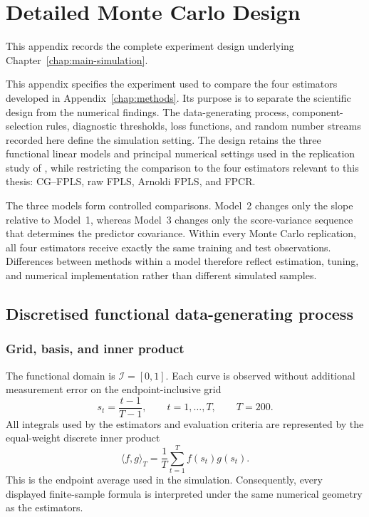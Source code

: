 \chapter{Detailed Monte Carlo Design}
\label{chap:simulation-design}

This appendix records the complete experiment design underlying
Chapter~\ref{chap:main-simulation}.

This appendix specifies the experiment used to compare the four estimators
developed in Appendix~\ref{chap:methods}.  Its purpose is to separate the
scientific design from the numerical findings.  The data-generating process,
component-selection rules, diagnostic thresholds, loss functions, and random
number streams recorded here define the simulation setting.  The design retains
the three functional linear models and principal numerical settings used in
the replication study of \textcite{babii_carrasco_tsafack_2026}, while
restricting the comparison to the four estimators relevant to this thesis:
CG--FPLS, raw FPLS, Arnoldi FPLS, and FPCR.

The three models form controlled comparisons.  Model~2 changes only the slope
relative to Model~1, whereas Model~3 changes only the score-variance sequence
that determines the predictor covariance.
Within every Monte Carlo replication, all four estimators receive exactly the
same training and test observations.  Differences between methods within a
model therefore reflect estimation, tuning, and numerical implementation
rather than different simulated samples.

\section{Discretised functional data-generating process}
\label{sec:simulation-dgp}

\subsection{Grid, basis, and inner product}

The functional domain is $\mathcal I=[0,1]$.  Each curve is observed without
additional measurement error on the endpoint-inclusive grid
\begin{equation}
    s_t=\frac{t-1}{T-1},
    \qquad t=1,\ldots,T,
    \qquad T=200.
    \label{eq:simulation-grid}
\end{equation}
All integrals used by the estimators and evaluation criteria are represented
by the equal-weight discrete inner product
\begin{equation}
    \langle f,g\rangle_T
    =\frac1T\sum_{t=1}^{T}f(s_t)g(s_t).
    \label{eq:simulation-inner-product}
\end{equation}
This is the endpoint average used in the simulation.
Consequently, every displayed finite-sample formula is interpreted under the
same numerical geometry as the estimators.

